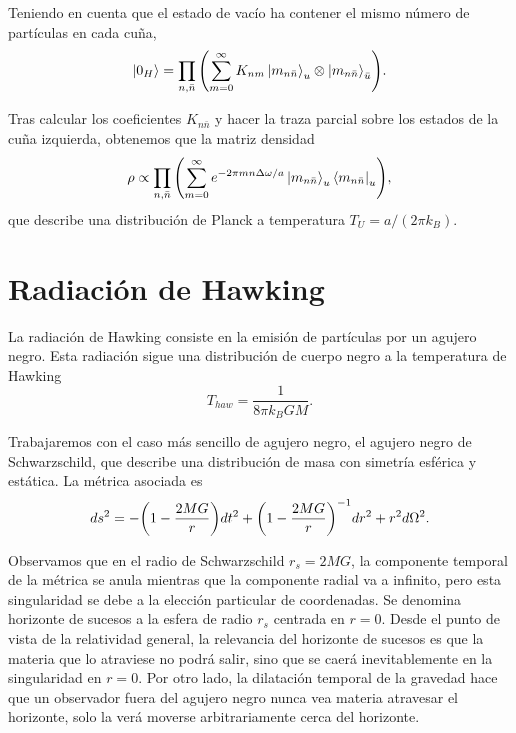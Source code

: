 Teniendo en cuenta que el estado de vacío ha contener el mismo número de partículas en cada cuña,
\begin{equation}
  \ket{0_H} = \prod_{n,\bar n} \qty(\sum_{m=0}^\infty K_{nm} \ket{m_{n\bar n}}_u\otimes \ket{m_{n\bar n}}_{\bar u}).
\end{equation}



Tras calcular los coeficientes $K_{n \bar n}$ y hacer la traza parcial sobre los estados de
la cuña izquierda, obtenemos que la matriz densidad
\begin{equation}
  \rho  \propto \prod_{n,\bar n} \qty(\sum_{m=0}^\infty e^{-2\pi m n\Delta  \omega/a}\ket{m_{n\bar n}}_u \bra{m_{n\bar n}}_u),
\end{equation}
que describe una distribución de Planck a temperatura $T_U=a/(2\pi k_B)$.



\section{Radiación de Hawking}
La radiación de Hawking consiste en la emisión de partículas por un agujero negro.
Esta radiación sigue una distribución de cuerpo negro a la temperatura de Hawking
\begin{equation}
  T_{haw}= \frac{1}{8\pi k_B G M}.
\end{equation}

Trabajaremos con el caso más sencillo de agujero negro, el agujero negro de Schwarzschild, que
describe una distribución de masa con simetría esférica y estática. La métrica asociada
es 
\begin{equation}
  ds^2= -\qty(1-\frac{2MG}{r})dt^2+\qty(1-\frac{2MG}{r})^{-1}dr^2+r^2d\Omega^2.
\end{equation}

Observamos que en el radio de Schwarzschild $r_s=2MG$, la componente temporal de la 
métrica se anula mientras que la componente radial va a infinito, pero esta singularidad se debe
a la elección particular de coordenadas.
Se denomina horizonte de sucesos a la esfera de radio $r_s$ centrada en $r=0$.
Desde el punto de vista de la relatividad general, la  relevancia del horizonte de sucesos es
que la materia que lo atraviese no podrá salir, sino que se caerá inevitablemente en la singularidad en $r=0$.
Por otro lado, la dilatación temporal de la gravedad  hace que un observador fuera del agujero negro nunca
vea materia atravesar el horizonte, solo la verá moverse arbitrariamente cerca del horizonte.

